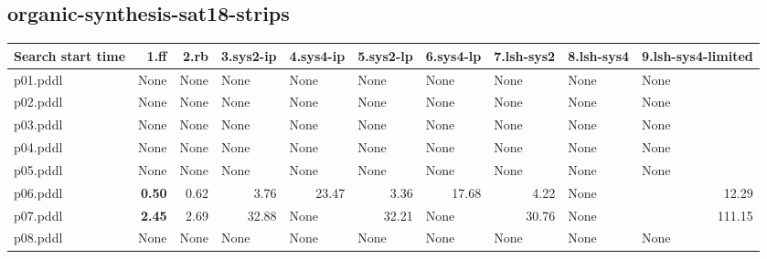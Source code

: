 \documentclass{article}
\begin{document}
\hypertarget{search_start_time-organic-synthesis-sat18-strips}{}
\subsection*{organic-synthesis-sat18-strips}

\begin{tabular}{@{}lrrrrrrrrr@{}}
Search start time & 1.ff & 2.rb & 3.sys2-ip & 4.sys4-ip & 5.sys2-lp & 6.sys4-lp & 7.lsh-sys2 & 8.lsh-sys4 & 9.lsh-sys4-limited \\
\midrule
p01.pddl & \multicolumn{1}{|l|}{None} & \multicolumn{1}{|l|}{None} & \multicolumn{1}{|l|}{None} & \multicolumn{1}{|l|}{None} & \multicolumn{1}{|l|}{None} & \multicolumn{1}{|l|}{None} & \multicolumn{1}{|l|}{None} & \multicolumn{1}{|l|}{None} & \multicolumn{1}{|l|}{None} \\
p02.pddl & \multicolumn{1}{|l|}{None} & \multicolumn{1}{|l|}{None} & \multicolumn{1}{|l|}{None} & \multicolumn{1}{|l|}{None} & \multicolumn{1}{|l|}{None} & \multicolumn{1}{|l|}{None} & \multicolumn{1}{|l|}{None} & \multicolumn{1}{|l|}{None} & \multicolumn{1}{|l|}{None} \\
p03.pddl & \multicolumn{1}{|l|}{None} & \multicolumn{1}{|l|}{None} & \multicolumn{1}{|l|}{None} & \multicolumn{1}{|l|}{None} & \multicolumn{1}{|l|}{None} & \multicolumn{1}{|l|}{None} & \multicolumn{1}{|l|}{None} & \multicolumn{1}{|l|}{None} & \multicolumn{1}{|l|}{None} \\
p04.pddl & \multicolumn{1}{|l|}{None} & \multicolumn{1}{|l|}{None} & \multicolumn{1}{|l|}{None} & \multicolumn{1}{|l|}{None} & \multicolumn{1}{|l|}{None} & \multicolumn{1}{|l|}{None} & \multicolumn{1}{|l|}{None} & \multicolumn{1}{|l|}{None} & \multicolumn{1}{|l|}{None} \\
p05.pddl & \multicolumn{1}{|l|}{None} & \multicolumn{1}{|l|}{None} & \multicolumn{1}{|l|}{None} & \multicolumn{1}{|l|}{None} & \multicolumn{1}{|l|}{None} & \multicolumn{1}{|l|}{None} & \multicolumn{1}{|l|}{None} & \multicolumn{1}{|l|}{None} & \multicolumn{1}{|l|}{None} \\
p06.pddl & \textbf{0.50} & 0.62 & 3.76 & 23.47 & 3.36 & 17.68 & 4.22 & \multicolumn{1}{|l|}{None} & 12.29 \\
p07.pddl & \textbf{2.45} & 2.69 & 32.88 & \multicolumn{1}{|l|}{None} & 32.21 & \multicolumn{1}{|l|}{None} & 30.76 & \multicolumn{1}{|l|}{None} & 111.15 \\
p08.pddl & \multicolumn{1}{|l|}{None} & \multicolumn{1}{|l|}{None} & \multicolumn{1}{|l|}{None} & \multicolumn{1}{|l|}{None} & \multicolumn{1}{|l|}{None} & \multicolumn{1}{|l|}{None} & \multicolumn{1}{|l|}{None} & \multicolumn{1}{|l|}{None} & \multicolumn{1}{|l|}{None} \\

\end{tabular}
\end{document}
